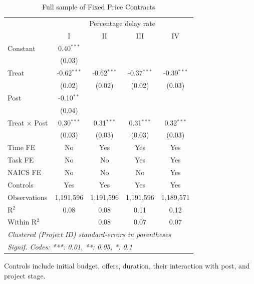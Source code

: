 \documentclass[
]{article}
\begin{document}
\begin{table}[htbp]
   \caption{Full sample of Fixed Price Contracts}
   \centering
   \footnotesize
   \begin{tabular}{lcccc}
      \toprule
       & \multicolumn{4}{c}{Percentage delay rate}\\
                           & I             & II            & III           & IV\\  
      \midrule 
      Constant             & 0.40$^{***}$  &               &               &   \\   
                           & (0.03)        &               &               &   \\   
      Treat                & -0.62$^{***}$ & -0.62$^{***}$ & -0.37$^{***}$ & -0.39$^{***}$\\   
                           & (0.02)        & (0.02)        & (0.02)        & (0.03)\\   
      Post                 & -0.10$^{**}$  &               &               &   \\   
                           & (0.04)        &               &               &   \\   
      Treat $\times$ Post  & 0.30$^{***}$  & 0.31$^{***}$  & 0.31$^{***}$  & 0.32$^{***}$\\   
                           & (0.03)        & (0.03)        & (0.03)        & (0.03)\\   
      \midrule 
      Time FE              & No            & Yes           & Yes           & Yes\\  
      Task FE              & No            & No            & Yes           & Yes\\  
      NAICS FE             & No            & No            & No            & Yes\\  
      Controls             & Yes           & Yes           & Yes           & Yes\\  
      Observations         & 1,191,596     & 1,191,596     & 1,191,596     & 1,189,571\\  
      R$^2$                & 0.08          & 0.08          & 0.11          & 0.12\\  
      Within R$^2$         &               & 0.08          & 0.07          & 0.07\\  
      \midrule
      \multicolumn{5}{l}{\emph{Clustered (Project ID) standard-errors in parentheses}}\\
      \multicolumn{5}{l}{\emph{Signif. Codes: ***: 0.01, **: 0.05, *: 0.1}}\\
   \end{tabular}
   
   \par \raggedright 
   Controls include initial budget, offers, duration, their interaction with post, and project stage. 
\end{table}
\end{document}
